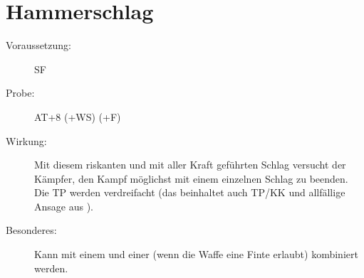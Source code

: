 \section{Hammerschlag}
\label{aktion.hammerschlag}
\begin{description}
    \item[Voraussetzung:]
        SF 
    \item[Probe:]
        AT+8 (+WS) (+F)
    \item[Wirkung:]
        Mit diesem riskanten und mit aller Kraft geführten Schlag versucht der Kämpfer, den Kampf möglichst mit einem einzelnen Schlag zu beenden.
        Die TP werden verdreifacht (das beinhaltet auch TP/KK und allfällige Ansage aus ).
    \item[Besonderes:]
        Kann mit einem  und einer  (wenn die Waffe eine Finte erlaubt) kombiniert werden.
\end{description}
